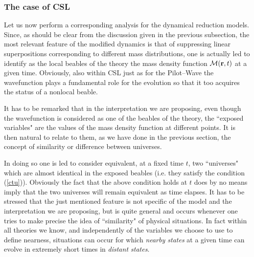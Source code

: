 \documentclass[10pt,a4paper]{article}
\begin{document}
\subsubsection{The case of CSL} \label{sec1252}

Let us now perform a corresponding analysis for the dynamical
reduction models. Since, as should be clear from the discussion
given in the previous subsection, the most relevant feature of the
modified dynamics is that of suppressing linear superpositions
corresponding to different mass distributions, one is actually led
to identify as the local beables of the theory the mass density
function ${\mathcal M}({\bf r},t)$ at a given time. Obviously,
also within CSL just as for the Pilot--Wave the wavefunction plays
a fundamental role for the evolution so that it too acquires the
status of a nonlocal beable.

It has to be remarked that in the interpretation we are proposing,
even though the wavefunction is considered as one of the beables
of the theory, the ``exposed variables" are the values of the mass
density function at different points. It is then natural to relate
to them, as we have done in the previous section, the concept of
similarity or difference between universes.

In doing so one is led to consider equivalent, at a fixed time
$t$, two ``universes" which are almost identical in the exposed
beables (i.e. they satisfy the condition (\ref{ctu})). Obviously
the fact that the above condition holds at $t$ does by no means
imply that the two universes will remain equivalent as time
elapses. It has to be stressed that the just mentioned feature is
not specific of  the model and the interpretation we are
proposing, but is quite general and occurs whenever one tries to
make precise the idea of ``similarity" of physical situations. In
fact within all theories we know, and independently of the
variables we choose to use to define nearness, situations can
occur for which {\it nearby states} at a given time can evolve in
extremely short times in {\it distant states}.
\end{document}
